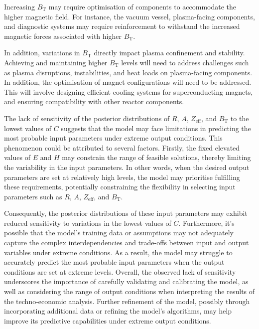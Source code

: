 \documentclass[journal]{IEEEtran}
\begin{document}
Increasing $B_{\text{T}}$ may require optimisation of components to accommodate the higher magnetic field. For instance, the vacuum vessel, plasma-facing components, and diagnostic systems may require reinforcement to withstand the increased magnetic forces associated with higher $B_{\text{T}}$. 

In addition, variations in $B_{\text{T}}$ directly impact plasma confinement and stability. Achieving and maintaining higher $B_{\text{T}}$ levels will need to address challenges such as plasma disruptions, instabilities, and heat loads on plasma-facing components. In addition, the optimisation of magnet configurations will need to be addressed. This will involve designing efficient cooling systems for superconducting magnets, and ensuring compatibility with other reactor components. 

The lack of sensitivity of the posterior distributions of $R$, $A$, $Z_{\text{eff}}$, and $B_{\text{T}}$ to the lowest values of $C$ suggests that the model may face limitations in predicting the most probable input parameters under extreme output conditions. This phenomenon could be attributed to several factors. Firstly, the fixed elevated values of $E$ and $H$ may constrain the range of feasible solutions, thereby limiting the variability in the input parameters. In other words, when the desired output parameters are set at relatively high levels, the model may prioritise fulfilling these requirements, potentially constraining the flexibility in selecting input parameters such as $R$, $A$, $Z_{\text{eff}}$, and $B_{\text{T}}$. 

Consequently, the posterior distributions of these input parameters may exhibit reduced sensitivity to variations in the lowest values of $C$. Furthermore, it's possible that the model's training data or assumptions may not adequately capture the complex interdependencies and trade-offs between input and output variables under extreme conditions. As a result, the model may struggle to accurately predict the most probable input parameters when the output conditions are set at extreme levels. Overall, the observed lack of sensitivity underscores the importance of carefully validating and calibrating the model, as well as considering the range of output conditions when interpreting the results of the techno-economic analysis. Further refinement of the model, possibly through incorporating additional data or refining the model's algorithms, may help improve its predictive capabilities under extreme output conditions.
\end{document}
